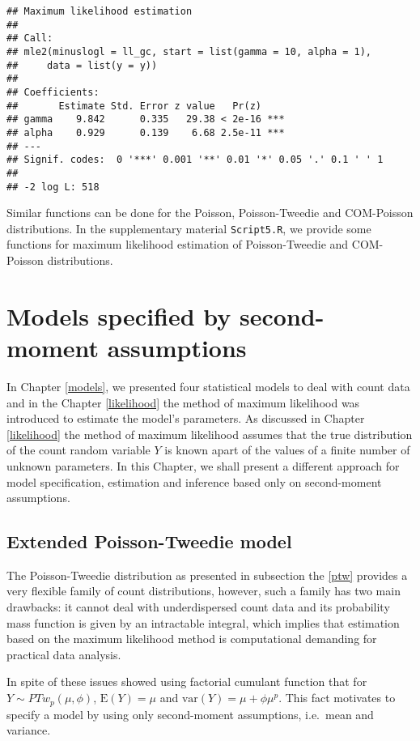 \documentclass[9pt,a5paper,]{book}
\theoremstyle{definition}
\theoremstyle{definition}
\theoremstyle{remark}
\begin{document}
\begin{verbatim}
## Maximum likelihood estimation
## 
## Call:
## mle2(minuslogl = ll_gc, start = list(gamma = 10, alpha = 1), 
##     data = list(y = y))
## 
## Coefficients:
##       Estimate Std. Error z value   Pr(z)    
## gamma    9.842      0.335   29.38 < 2e-16 ***
## alpha    0.929      0.139    6.68 2.5e-11 ***
## ---
## Signif. codes:  0 '***' 0.001 '**' 0.01 '*' 0.05 '.' 0.1 ' ' 1
## 
## -2 log L: 518
\end{verbatim}

Similar functions can be done for the Poisson, Poisson-Tweedie and
COM-Poisson distributions. In the supplementary material
\texttt{Script5.R}, we provide some functions for maximum likelihood
estimation of Poisson-Tweedie and COM-Poisson distributions.

\chapter{Models specified by second-moment assumptions}\label{SM}

In Chapter \ref{models}, we presented four statistical models to deal
with count data and in the Chapter \ref{likelihood} the method of
maximum likelihood was introduced to estimate the model's parameters. As
discussed in Chapter \ref{likelihood} the method of maximum likelihood
assumes that the true distribution of the count random variable \(Y\) is
known apart of the values of a finite number of unknown parameters. In
this Chapter, we shall present a different approach for model
specification, estimation and inference based only on second-moment
assumptions.

\section{Extended Poisson-Tweedie
model}\label{extended-poisson-tweedie-model}

The Poisson-Tweedie distribution as presented in subsection the
\ref{ptw} provides a very flexible family of count distributions,
however, such a family has two main drawbacks: it cannot deal with
underdispersed count data and its probability mass function is given by
an intractable integral, which implies that estimation based on the
maximum likelihood method is computational demanding for practical data
analysis.

In spite of these issues \citet{Jorgensen2014} showed using factorial
cumulant function that for \(Y \sim PTw_p(\mu, \phi)\),
\(\mathrm{E}(Y) = \mu\) and \(\mathrm{var}(Y) = \mu + \phi \mu^p\). This
fact motivates \citet{Bonat2016b} to specify a model by using only
second-moment assumptions, i.e.~mean and variance.
\end{document}
